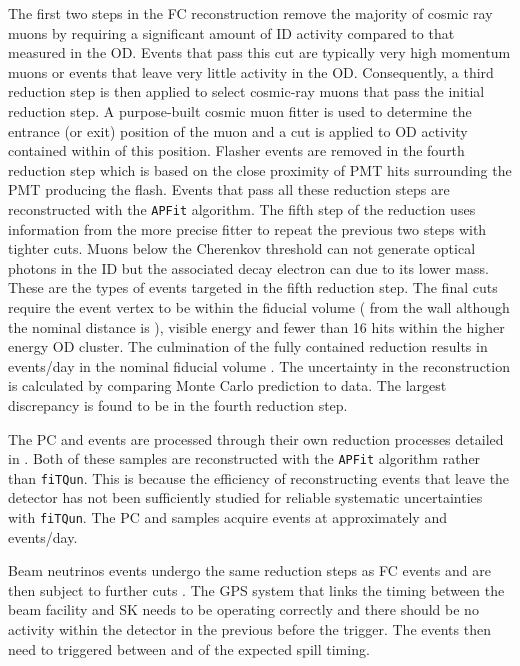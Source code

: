 The first two steps in the FC reconstruction remove the majority of cosmic ray muons by requiring a significant amount of ID activity compared to that measured in the OD. Events that pass this cut are typically very high momentum muons or events that leave very little activity in the OD. Consequently, a third reduction step is then applied to select cosmic-ray muons that pass the initial reduction step. A purpose-built cosmic muon fitter is used to determine the entrance (or exit) position of the muon and a cut is applied to OD activity contained within  of this position. Flasher events are removed in the fourth reduction step which is based on the close proximity of PMT hits surrounding the PMT producing the flash. Events that pass all these reduction steps are reconstructed with the \texttt{APFit} algorithm. The fifth step of the reduction uses information from the more precise fitter to repeat the previous two steps with tighter cuts. Muons below the Cherenkov threshold can not generate optical photons in the ID but the associated decay electron can due to its lower mass. These are the types of events targeted in the fifth reduction step. The final cuts require the event vertex to be within the fiducial volume ( from the wall although the nominal distance is ), visible energy  and fewer than 16 hits within the higher energy OD cluster. The culmination of the fully contained reduction results in  events/day in the nominal fiducial volume \cite{thesis_miao}. The uncertainty in the reconstruction is calculated by comparing Monte Carlo prediction to data. The largest discrepancy is found to be  in the fourth reduction step.

The PC and  events are processed through their own reduction processes detailed in \cite{Ashie_2005}. Both of these samples are reconstructed with the \texttt{APFit} algorithm rather than \texttt{fiTQun}. This is because the efficiency of reconstructing events that leave the detector has not been sufficiently studied for reliable systematic uncertainties with \texttt{fiTQun}. The PC and  samples acquire events at approximately  and  events/day.

Beam neutrinos events undergo the same reduction steps as FC events and are then subject to further cuts \cite{t2k_tn_027}. The GPS system that links the timing between the beam facility and SK needs to be operating correctly and there should be no activity within the detector in the previous  before the trigger. The events then need to triggered between  and  of the expected spill timing.


